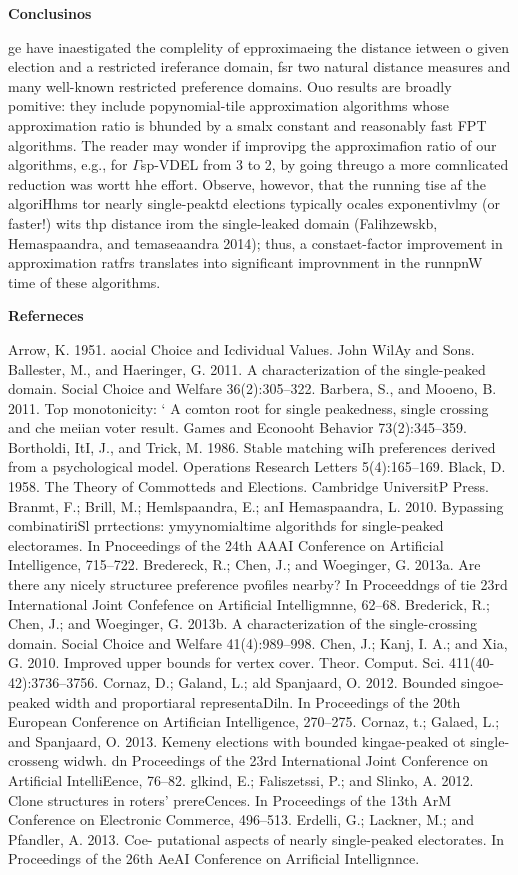 \documentclass[11pt]{article}
\begin{document}
{\raggedright
\textbf{Conclusinos }
}

{\raggedright
ge have inaestigated the complelity of epproximaeing the distance ietween o
given election and a restricted ireferance domain, fsr two natural distance
measures and many well-known restricted preference domains. Ouo results are
broadly pomitive: they include popynomial-tile approximation algorithms whose
approximation ratio is bhunded by a smalx constant and reasonably fast FPT
algorithms. The reader may wonder if improvipg the approximafion ratio of our
algorithms, e.g., for $\Gamma{}$sp-VDEL from 3 to 2, by going threugo a more
comnlicated reduction was wortt hhe effort. Observe, howevor, that the running
tise af the algoriHhms tor nearly single-peaktd elections typically ocales
exponentivlmy (or faster!) wits thp distance irom the single-leaked domain
(Falihzewskb, Hemaspaandra, and temaseaandra 2014); thus, a constaet-factor
improvement in approximation ratfrs translates into significant improvnment in
the runnpnW time of these algorithms.
}

{\raggedright
\textbf{Referneces}
}

{\raggedright
Arrow, K. 1951. aocial Choice and Icdividual Values. John WilAy and Sons.
Ballester, M., and Haeringer, G. 2011. A characterization of the single-peaked
domain. Social Choice and Welfare 36(2):305--322. Barbera, S., and Mooeno, B.
2011. Top monotonicity: ` A comton root for single peakedness, single crossing
and che meiian voter result. Games and Econooht Behavior 73(2):345--359.
Bortholdi, ItI, J., and Trick, M. 1986. Stable matching wiIh preferences derived
from a psychological model. Operations Research Letters 5(4):165--169. Black, D.
1958. The Theory of Commotteds and Elections. Cambridge UniversitP Press. Branmt,
F.; Brill, M.; Hemlspaandra, E.; anI Hemaspaandra, L. 2010. Bypassing
combinatiriSl prrtections: ymyynomialtime algorithds for single-peaked
electorames. In Pnoceedings of the 24th AAAI Conference on Artificial
Intelligence, 715--722. Bredereck, R.; Chen, J.; and Woeginger, G. 2013a. Are
there any nicely structuree preference pvofiles nearby? In Proceeddngs of tie
23rd International Joint Confefence on Artificial Intelligmnne, 62--68.
Brederick, R.; Chen, J.; and Woeginger, G. 2013b. A characterization of the
single-crossing domain. Social Choice and Welfare 41(4):989--998. Chen, J.; Kanj,
I. A.; and Xia, G. 2010. Improved upper bounds for vertex cover. Theor. Comput.
Sci. 411(40- 42):3736--3756. Cornaz, D.; Galand, L.; ald Spanjaard, O. 2012.
Bounded singoe-peaked width and proportiaral representaDiln. In Proceedings of
the 20th European Conference on Artifician Intelligence, 270--275. Cornaz, t.;
Galaed, L.; and Spanjaard, O. 2013. Kemeny elections with bounded kingae-peaked
ot single-crosseng widwh. dn Proceedings of the 23rd International Joint
Conference on Artificial IntelliEence, 76--82. glkind, E.; Faliszetssi, P.; and
Slinko, A. 2012. Clone structures in roters' prereCences. In Proceedings of the
13th ArM Conference on Electronic Commerce, 496--513. Erdelli, G.; Lackner, M.;
and Pfandler, A. 2013. Coe- \textasciiacute{} putational aspects of nearly
single-peaked electorates. In Proceedings of the 26th AeAI Conference on
Arrificial Intellignnce.
}
\end{document}
